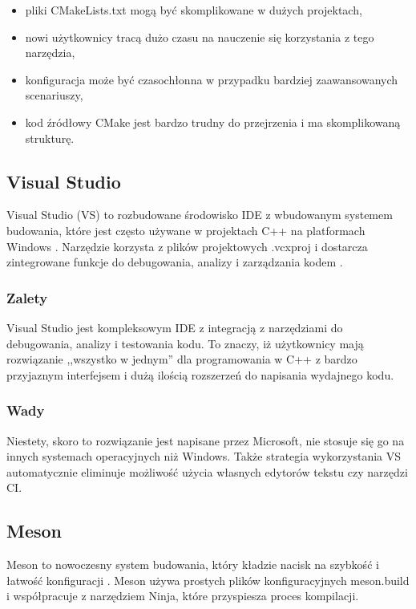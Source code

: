 \begin{itemize}
    \item pliki CMakeLists.txt mogą być skomplikowane w dużych projektach,
    \item nowi użytkownicy tracą dużo czasu na nauczenie się korzystania z tego narzędzia,
    \item konfiguracja może być czasochłonna w przypadku bardziej zaawansowanych scenariuszy,
    \item kod źródłowy CMake jest bardzo trudny do przejrzenia i ma skomplikowaną strukturę.
\end{itemize}

\subsection{Visual Studio}
Visual Studio (VS) to rozbudowane środowisko IDE z wbudowanym systemem budowania, które jest często używane w projektach C++ na platformach Windows \cite{vs}. Narzędzie korzysta z plików projektowych .vcxproj i dostarcza zintegrowane funkcje do debugowania, analizy i zarządzania kodem \cite{vs-cpp-debug}.

\subsubsection{Zalety}
Visual Studio jest kompleksowym IDE z integracją z narzędziami do debugowania, analizy i testowania kodu. To znaczy, iż użytkownicy mają rozwiązanie ,,wszystko w jednym'' dla programowania w C++ z bardzo przyjaznym interfejsem i dużą ilością rozszerzeń do napisania wydajnego kodu.

\subsubsection{Wady}
Niestety, skoro to rozwiązanie jest napisane przez Microsoft, nie stosuje się go na innych systemach operacyjnych niż Windows. Także strategia wykorzystania VS automatycznie eliminuje możliwość użycia własnych edytorów tekstu czy narzędzi CI.

\subsection{Meson}
Meson to nowoczesny system budowania, który kładzie nacisk na szybkość i łatwość konfiguracji \cite{meson}. Meson używa prostych plików konfiguracyjnych meson.build i współpracuje z narzędziem Ninja, które przyspiesza proces kompilacji.

